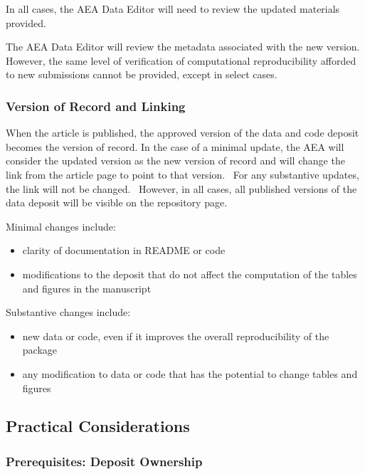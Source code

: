 In all cases, the AEA Data Editor will need to review the updated
materials provided.

The AEA Data Editor will review the metadata associated with the new
version. However, the same level of verification of computational
reproducibility afforded to new submissions cannot be provided, except
in select cases.

\subsubsection{Version of Record and
Linking}\label{version-of-record-and-linking}

When the article is published, the approved version of the data and code
deposit becomes the version of record. In the case of a minimal update,
the AEA will consider the updated version as the new version of record
and will change the link from the article page to point to that
version.~ For any substantive updates, the link will not be changed.~
However, in all cases, all published versions of the data deposit will
be visible on the repository page.

Minimal changes include:

\begin{itemize}
\tightlist
\item
  clarity of documentation in README or code
\item
  ­modifications to the deposit that do not affect the computation of
  the tables and figures in the manuscript
\end{itemize}

Substantive changes include:

\begin{itemize}
\tightlist
\item
  new data or code, even if it improves the overall reproducibility of
  the package
\item
  any modification to data or code that has the potential to change
  tables and figures
\end{itemize}

\subsection{Practical
Considerations}\label{practical-considerations}

\subsubsection{Prerequisites: Deposit
Ownership}\label{prerequisites-deposit-ownership}

